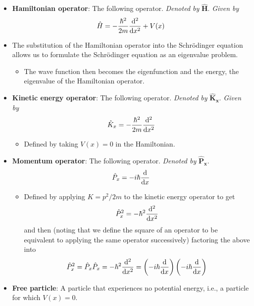 \documentclass[../notes.tex]{subfiles}
\begin{document}
\begin{itemize}
    \item \textbf{Hamiltonian operator}: The following operator. \emph{Denoted by} $\bm{\hat{H}}$. \emph{Given by}
    \begin{equation*}
        \hat{H} = -\frac{\hbar^2}{2m}\dv[2]{x}+V(x)
    \end{equation*}
    \item The substitution of the Hamiltonian operator into the Schr\"{o}dinger equation allows us to formulate the Schr\"{o}dinger equation as an eigenvalue problem.
    \begin{itemize}
        \item The wave function then becomes the eigenfunction and the energy, the eigenvalue of the Hamiltonian operator.
    \end{itemize}
    \item \textbf{Kinetic energy operator}: The following operator. \emph{Denoted by} $\bm{\hat{K}_x}$. \emph{Given by}
    \begin{equation*}
        \hat{K}_x = -\frac{\hbar^2}{2m}\dv[2]{x}
    \end{equation*}
    \begin{itemize}
        \item Defined by taking $V(x)=0$ in the Hamiltonian.
    \end{itemize}
    \item \textbf{Momentum operator}: The following operator. \emph{Denoted by} $\bm{\hat{P}_x}$.
    \begin{equation*}
        \hat{P}_x = -i\hbar\dv{x}
    \end{equation*}
    \begin{itemize}
        \item Defined by applying $K=p^2/2m$ to the kinetic energy operator to get
        \begin{equation*}
            \hat{P}_x^2 = -\hbar^2\dv[2]{x}
        \end{equation*}
        and then (noting that we define the square of an operator to be equivalent to applying the same operator successively) factoring the above into
        \begin{equation*}
            \hat{P}_x^2 = \hat{P}_x\hat{P}_x = -\hbar^2\dv[2]{x} = \left( -i\hbar\dv{x} \right)\left( -i\hbar\dv{x} \right)
        \end{equation*}
    \end{itemize}
    \item \textbf{Free particle}: A particle that experiences no potential energy, i.e., a particle for which $V(x)=0$.

\end{itemize}
\end{document}
